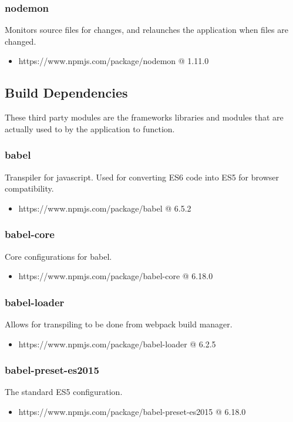   \subsubsection{nodemon}
  Monitors source files for changes, and relaunches the application when files are changed.
  \begin{itemize}
    \item https://www.npmjs.com/package/nodemon @ 1.11.0
  \end{itemize}

\subsection{Build Dependencies}
  These third party modules are the frameworks libraries and modules that are actually used to by the application to function. 

  \subsubsection{babel}
  Transpiler for javascript. Used for converting ES6 code into ES5 for browser compatibility.
  \begin{itemize}
    \item https://www.npmjs.com/package/babel @ 6.5.2
  \end{itemize}

  \subsubsection{babel-core}
  Core configurations for babel.
  \begin{itemize}
    \item https://www.npmjs.com/package/babel-core @ 6.18.0
  \end{itemize}

  \subsubsection{babel-loader}
  Allows for transpiling to be done from webpack build manager.
  \begin{itemize}
    \item https://www.npmjs.com/package/babel-loader @ 6.2.5
  \end{itemize}

  \subsubsection{babel-preset-es2015}
  The standard ES5 configuration.
  \begin{itemize}
    \item https://www.npmjs.com/package/babel-preset-es2015 @ 6.18.0
  \end{itemize}

